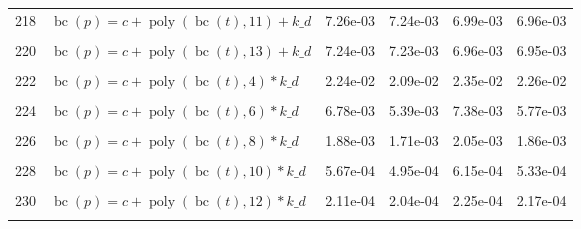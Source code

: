 \documentclass[12pt,a4paper]{article}
\DeclareMathOperator{\bc}{bc}
\DeclareMathOperator{\poly}{poly}
\begin{document}
\begin{longtable}[t]{ll>{\raggedleft\arraybackslash}p{2cm}>{\raggedleft\arraybackslash}p{2cm}>{\raggedleft\arraybackslash}p{2cm}>{\raggedleft\arraybackslash}p{2cm}}
218 & $\bc(p) = c + \poly\left( \bc(t), 11 \right) + k\_d$ & 7.26e-03 & 7.24e-03 & 6.99e-03 & 6.96e-03\\
\cellcolor{gray!6}{219} & \cellcolor{gray!6}{$\bc(p) = c + \poly\left( \bc(t), 12 \right) + k\_d$} & \cellcolor{gray!6}{7.24e-03} & \cellcolor{gray!6}{7.23e-03} & \cellcolor{gray!6}{6.96e-03} & \cellcolor{gray!6}{6.95e-03}\\
220 & $\bc(p) = c + \poly\left( \bc(t), 13 \right) + k\_d$ & 7.24e-03 & 7.23e-03 & 6.96e-03 & 6.95e-03\\
\cellcolor{gray!6}{221} & \cellcolor{gray!6}{$\bc(p) = c + \poly\left( \bc(t), 3 \right) * k\_d$} & \cellcolor{gray!6}{5.46e-02} & \cellcolor{gray!6}{1.72e-02} & \cellcolor{gray!6}{1.91e-02} & \cellcolor{gray!6}{1.79e-02}\\
222 & $\bc(p) = c + \poly\left( \bc(t), 4 \right) * k\_d$ & 2.24e-02 & 2.09e-02 & 2.35e-02 & 2.26e-02\\
\cellcolor{gray!6}{223} & \cellcolor{gray!6}{$\bc(p) = c + \poly\left( \bc(t), 5 \right) * k\_d$} & \cellcolor{gray!6}{9.00e-03} & \cellcolor{gray!6}{8.98e-03} & \cellcolor{gray!6}{8.58e-03} & \cellcolor{gray!6}{8.58e-03}\\
224 & $\bc(p) = c + \poly\left( \bc(t), 6 \right) * k\_d$ & 6.78e-03 & 5.39e-03 & 7.38e-03 & 5.77e-03\\
\cellcolor{gray!6}{225} & \cellcolor{gray!6}{$\bc(p) = c + \poly\left( \bc(t), 7 \right) * k\_d$} & \cellcolor{gray!6}{2.25e-03} & \cellcolor{gray!6}{2.10e-03} & \cellcolor{gray!6}{2.33e-03} & \cellcolor{gray!6}{2.18e-03}\\
226 & $\bc(p) = c + \poly\left( \bc(t), 8 \right) * k\_d$ & 1.88e-03 & 1.71e-03 & 2.05e-03 & 1.86e-03\\
\cellcolor{gray!6}{227} & \cellcolor{gray!6}{$\bc(p) = c + \poly\left( \bc(t), 9 \right) * k\_d$} & \cellcolor{gray!6}{6.36e-04} & \cellcolor{gray!6}{6.18e-04} & \cellcolor{gray!6}{6.31e-04} & \cellcolor{gray!6}{6.07e-04}\\
228 & $\bc(p) = c + \poly\left( \bc(t), 10 \right) * k\_d$ & 5.67e-04 & 4.95e-04 & 6.15e-04 & 5.33e-04\\
\cellcolor{gray!6}{229} & \cellcolor{gray!6}{$\bc(p) = c + \poly\left( \bc(t), 11 \right) * k\_d$} & \cellcolor{gray!6}{2.10e-04} & \cellcolor{gray!6}{2.07e-04} & \cellcolor{gray!6}{2.19e-04} & \cellcolor{gray!6}{2.16e-04}\\
230 & $\bc(p) = c + \poly\left( \bc(t), 12 \right) * k\_d$ & 2.11e-04 & 2.04e-04 & 2.25e-04 & 2.17e-04\\
\cellcolor{gray!6}{231} & \cellcolor{gray!6}{$\bc(p) = c + \poly\left( \bc(t), 13 \right) * k\_d$} & \cellcolor{gray!6}{1.57e-04} & \cellcolor{gray!6}{1.56e-04} & \cellcolor{gray!6}{1.64e-04} & \cellcolor{gray!6}{1.63e-04}\\*
\end{longtable}
\endgroup{}
\end{document}
